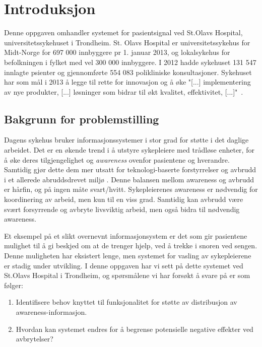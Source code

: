 \chapter{Introduksjon}
\label{chp: introduksjon}

Denne oppgaven omhandler systemet for pasientsignal ved St.Olavs Hospital, universitetssykehuset i Trondheim. St. Olavs Hospital er universitetssykehus for Midt-Norge for 697 000 innbyggere pr 1. januar 2013, og lokalsykehus for befolkningen i fylket med vel 300 000 innbyggere. I 2012 hadde sykehuset 131 547 innlagte psienter og gjennomførte 554 083 polikliniske konsultasjoner. \cite{stolavs} Sykehuset har som mål i 2013 å legge til rette for innovasjon og å øke "[...] implementering av nye produkter, [...] løsninger som bidrar til økt kvalitet, effektivitet, [...]"\ \cite{styring13}.

\section{Bakgrunn for problemstilling}
Dagens sykehus bruker informasjonssystemer i stor grad for støtte i det daglige arbeidet. Det er en økende trend i å utstyre sykepleiere med trådløse enheter, for å øke deres tilgjengelighet og \emph{awareness} ovenfor pasientene og hverandre. Samtidig gjør dette dem mer utsatt for teknologi-baserte forstyrrelser og avbrudd i et allerede abruddsdrevet miljø \cite{Klemets12}. Denne balansen mellom awareness og avbrudd er hårfin, og på ingen måte svart/hvitt. Sykepleierenes awareness er nødvendig for koordinering av arbeid, men kun til en viss grad. Samtidig kan avbrudd være svært forsyrrende og avbryte livsviktig arbeid, men også bidra til nødvendig awareness. 

\noindent
Et eksempel på et slikt overnevnt informasjonsystem er det som gir pasientene mulighet til å gi beskjed om at de trenger hjelp, ved å trekke i snoren ved sengen. Denne muligheten har eksistert lenge, men systemet for vasling av sykepleierene er stadig under utvikling. I denne oppgaven har vi sett på dette systemet ved St.Olavs Hospital i Trondheim, og spørsmålene vi har forsøkt å svare på er som følger:

\begin{enumerate}
  \item Identifisere behov knyttet til funksjonalitet for støtte av distribusjon av awareness-informasjon.
  \item Hvordan kan systemet endres for å begrense potensielle negative effekter ved avbrytelser?
\end{enumerate}

